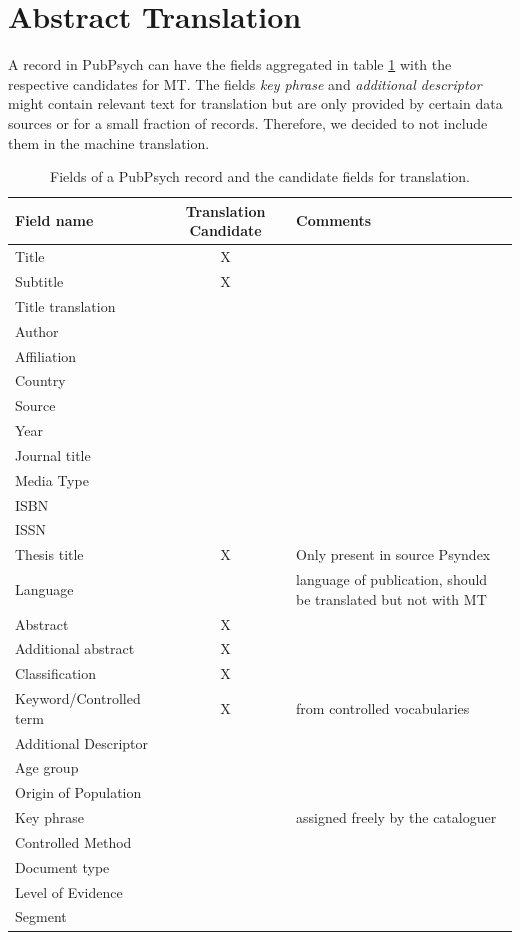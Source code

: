 \documentclass[a4paper,11pt]{article}
\begin{document}
\section{Abstract Translation}

A record in PubPsych can have the fields aggregated in table \ref{tab:fields} with the respective candidates for MT. The fields \textit{key phrase} and \textit{additional descriptor} might contain relevant text for translation but are only provided by certain data sources or for a small fraction of records. Therefore, we decided to not include them in the machine translation.
\begin{table}[h]
 \centering\textbf{}
\begin{tabular}[h]{lcp{5.7cm}}
    \toprule
    Field name & Translation Candidate & Comments \\
    \midrule
	Title & X &\\
	Subtitle & X &\\
	Title translation &  &\\
	Author &  &\\
 	Affiliation &  &\\
	Country &  &\\
 	Source & & \\
	Year & & \\
	Journal title & & \\
	Media Type & & \\
	ISBN &  &\\
	ISSN & & \\
	Thesis title & X & Only present in source Psyndex\\
	Language & & language of publication, should be translated but not with MT \\
	Abstract & X &\\
	Additional abstract & X &\\
	Classification & X &\\
	Keyword/Controlled term & X & from controlled vocabularies\\
	Additional Descriptor &  &\\
	Age group & & \\
	Origin of Population & & \\
	Key phrase & & assigned freely by the cataloguer\\
	Controlled Method & & \\
	Document type & & \\
	Level of Evidence & & \\
	Segment &  &\\
    \bottomrule
 \end{tabular}
  \caption{Fields of a PubPsych record and the candidate fields for translation.}
 \label{tab:fields}
\end{table}
\end{document}
